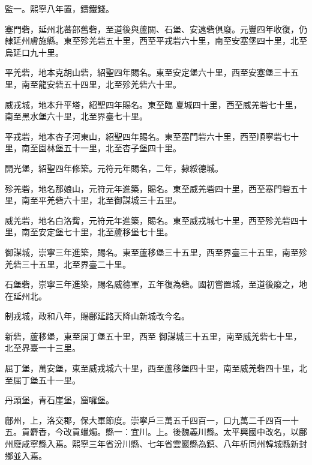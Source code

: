 \begin{pinyinscope}
 監一。熙寧八年置，鑄鐵錢。



 塞門砦，延州北蕃部舊砦，至道後與蘆關、石堡、安遠砦俱廢。元豐四年收復，仍隸延州膚施縣。東至殄羌砦五十里，西至平戎砦六十里，南至安塞堡四十里，北至烏延口九十里。



 平羌砦，地本克胡山砦，紹聖四年賜名。東至安定堡六十里，西至安塞堡三十五里，南至龍安砦五十四里，北至殄羌砦六十里。



 威戎城，地本升平塔，紹聖四年賜名。東至臨
 夏城四十里，西至威羌砦七十里，南至黑水堡六十里，北至界臺七十里。



 平戎砦，地本杏子河東山，紹聖四年賜名。東至塞門砦六十里，西至順寧砦七十里，南至園林堡五十一里，北至杏子堡四十里。



 開光堡，紹聖四年修築。元符元年賜名，二年，隸綏德城。



 殄羌砦，地名那娘山，元符元年進築，賜名。東至威羌砦四十里，西至塞門砦五十里，南至平羌砦六十里，北至御謀城三十五里。



 威羌砦，地名白洛觜，元符元年進築，賜名。東至威戎城七十里，西至殄羌砦四十里，南至安定堡七十里，北至蘆移堡七十里。



 御謀城，崇寧三年進築，賜名。東至蘆移堡三十五里，西至界臺三十五里，南至殄羌砦三十五里，北至界臺二十里。



 石堡砦，崇寧三年進築，賜名威德軍，五年復為砦。國初嘗置城，至道後廢之，地在延州北。



 制戎城，政和八年，賜鄜延路天降山新城改今名。



 新砦，蘆移堡，東至屈丁堡五十里，西至
 御謀城三十五里，南至威羌砦七十里，北至界臺一十三里。



 屈丁堡，萬安堡，東至威戎城六十里，西至蘆移堡四十里，南至威羌砦四十里，北至屈丁堡五十一里。



 丹頭堡，青石崖堡，窟囉堡。



 鄜州，上，洛交郡，保大軍節度。崇寧戶三萬五千四百一，口九萬二千四百一十五。貢麝香，今改貢蠟燭。縣一：宜川。上。後魏義川縣。太平興國中改名，以鄜州廢咸寧縣入焉。熙寧三年省汾川縣、七年省雲巖縣為鎮、八年析同州韓城縣新封鄉並入焉。




\end{pinyinscope}

